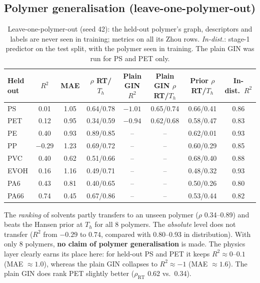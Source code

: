 \documentclass[11pt,a4paper]{article}
\begin{document}
\subsection{Polymer generalisation (leave-one-polymer-out)}
\label{sec:lopo}
\begin{table}[H]
\centering\small
\begin{tabular}{lccccccc}
\toprule
Held out & $R^2$ & MAE & $\rho$ RT/$T_h$ & Plain GIN $R^2$ & Plain GIN $\rho$ RT/$T_h$ & Prior $\rho$ RT/$T_h$ & In-dist.\ $R^2$\\
\midrule
PS   & 0.01    & 1.05 & 0.64/0.78 & $-1.01$ & 0.65/0.74 & 0.66/0.41 & 0.86\\
PET  & 0.12    & 0.95 & 0.34/0.59 & $-0.94$ & 0.62/0.68 & 0.58/0.47 & 0.83\\
PE   & 0.40    & 0.93 & 0.89/0.85 & --      & --        & 0.62/0.01 & 0.93\\
PP   & $-0.29$ & 1.23 & 0.69/0.72 & --      & --        & 0.60/0.29 & 0.85\\
PVC  & 0.40    & 0.62 & 0.51/0.66 & --      & --        & 0.68/0.40 & 0.88\\
EVOH & 0.16    & 1.16 & 0.49/0.71 & --      & --        & 0.48/0.32 & 0.93\\
PA6  & 0.43    & 0.81 & 0.40/0.65 & --      & --        & 0.50/0.26 & 0.80\\
PA66 & 0.74    & 0.45 & 0.67/0.86 & --      & --        & 0.53/0.44 & 0.82\\
\bottomrule
\end{tabular}
\caption{Leave-one-polymer-out (seed 42): the held-out polymer's graph, descriptors and labels are never
seen in training; metrics on all its Zhou rows. \emph{In-dist.}: stage-1 predictor on the test split,
with the polymer seen in training. The plain GIN was run for PS and PET only.}
\label{tab:lopo}
\end{table}

The \emph{ranking} of solvents partly transfers to an unseen polymer ($\rho$ 0.34--0.89) and beats the
Hansen prior at $T_h$ for all 8 polymers. The \emph{absolute} level does not transfer ($R^2$ from
$-0.29$ to $0.74$, compared with 0.80--0.93 in distribution). With only 8 polymers, \textbf{no claim of
polymer generalisation} is made. The physics layer clearly earns its place here: for held-out PS and PET
it keeps $R^2\approx 0$--$0.1$ (MAE $\approx 1.0$), whereas the plain GIN collapses to $R^2\approx-1$
(MAE $\approx 1.6$). The plain GIN does rank PET slightly better ($\rho_{\text{RT}}$ 0.62 vs.\ 0.34).
\end{document}

